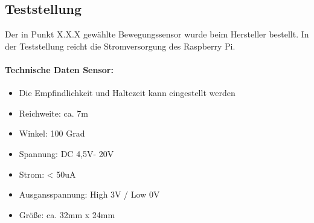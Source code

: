 \subsection{Teststellung}
Der in Punkt X.X.X gewählte Bewegungssensor wurde beim Hersteller bestellt. In der Teststellung reicht die Stromversorgung des Raspberry Pi. 
\paragraph{Technische Daten Sensor:}
\begin{itemize}
\item Die Empfindlichkeit und Haltezeit kann eingestellt werden
\item Reichweite: ca. 7m
\item Winkel: 100 Grad
\item Spannung: DC 4,5V- 20V
\item Strom: < 50uA
\item Ausgansspannung: High 3V / Low 0V
\item Größe: ca. 32mm x 24mm
\end{itemize}

